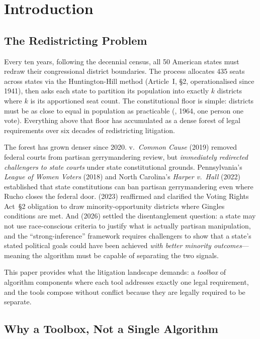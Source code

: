\section{Introduction}
\label{sec:introduction}

\subsection{The Redistricting Problem}

Every ten years, following the decennial census, all 50 American states must
redraw their congressional district boundaries.
The process allocates 435 seats across states via the Huntington-Hill method
(Article~I, \S2, operationalised since 1941), then asks each state to partition
its population into exactly $k$ districts where $k$ is its apportioned seat count.
The constitutional floor is simple: districts must be as close to equal in
population as practicable (\wesberry{}, 1964, one person one vote).
Everything above that floor has accumulated as a dense forest of legal requirements
over six decades of redistricting litigation.

The forest has grown denser since 2020.
\rucho{} v.\ \textit{Common Cause} (2019) removed federal courts from partisan
gerrymandering review, but \emph{immediately redirected challengers to state
courts} under state constitutional grounds.
Pennsylvania's \emph{League of Women Voters} (2018) and North Carolina's
\emph{Harper v.\ Hall} (2022) established that state constitutions can ban
partisan gerrymandering even where Rucho closes the federal door.
\allenmilligan{} (2023) reaffirmed and clarified the Voting Rights Act~\S2
obligation to draw minority-opportunity districts where Gingles conditions are met.
And \callais{} (2026) settled the disentanglement question: a state may not
use race-conscious criteria to justify what is actually partisan manipulation,
and the ``strong-inference'' framework requires challengers to show that a
state's stated political goals could have been achieved \emph{with better
minority outcomes}---meaning the algorithm must be capable of separating the
two signals.

This paper provides what the litigation landscape demands:
a \emph{toolbox} of algorithm components where each tool addresses exactly one
legal requirement, and the tools compose without conflict because they are
legally required to be separate.

\subsection{Why a Toolbox, Not a Single Algorithm}

